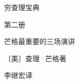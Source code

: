 \thispagestyle{empty}
\vspace*{3em}
\begin{center}
  {\xbsong{}穷查理宝典\par}
  \vspace{1em}
  {\kaishu{}第二册\par}
  \vspace{1.5em}
  {\heiti{}芒格最重要的三场演讲\par}
  \vspace{4em}
  {\kaishu〔美〕查理·芒格\q 著\par}
  \vspace{0.8em}
  {\kaishu 李继宏\q 译\par}
\end{center}
\cleardoublepage



